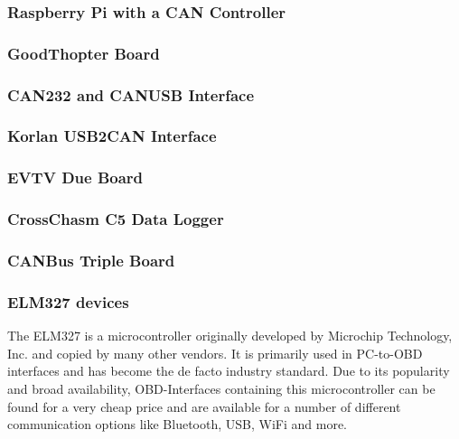 \subsubsection{Raspberry Pi with a CAN Controller}
\subsubsection{GoodThopter Board}
\subsubsection{CAN232 and CANUSB Interface}
\subsubsection{Korlan USB2CAN Interface}
\subsubsection{EVTV Due Board}
\subsubsection{CrossChasm C5 Data Logger}
\subsubsection{CANBus Triple Board}


\subsubsection{ELM327 devices}
The ELM327 is a microcontroller originally developed by Microchip Technology, Inc. and copied by many other vendors. It is primarily used in PC-to-OBD interfaces and has become the de facto industry standard. 
Due to its popularity and broad availability, OBD-Interfaces containing this microcontroller can be found for a very cheap price and are available for a number of different communication options like Bluetooth, USB, WiFi and more.


